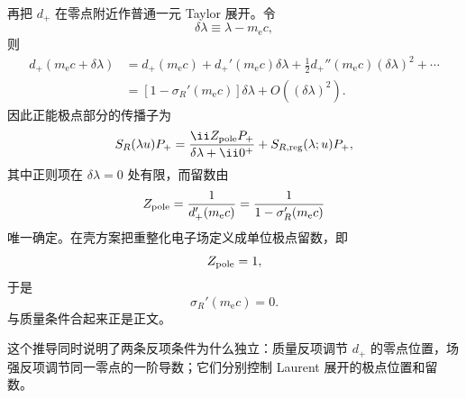 \begin{derivation}
再把 $d_+$ 在零点附近作普通一元 Taylor 展开。令
\begin{equation*}
 \delta\lambda\equiv\lambda-m_{\mathrm e} c,
\end{equation*}
则
\begin{align*}
 d_+(m_{\mathrm e} c+\delta\lambda)
 &=d_+(m_{\mathrm e} c)
 +d_+'(m_{\mathrm e} c)\delta\lambda
 +\frac12d_+''(m_{\mathrm e} c)(\delta\lambda)^2+\cdots\\
 &=\left[1-\sigma_R'(m_{\mathrm e} c)\right]\delta\lambda
 +O((\delta\lambda)^2).
\end{align*}
因此正能极点部分的传播子为
\begin{equation*}
 S_R(\lambda u)P_+
 =\frac{\ii Z_{\rm pole}P_+}{\delta\lambda+\ii0^+}
 +S_{R,\mathrm{reg}}(\lambda;u)P_+,
\end{equation*}
其中正则项在 $\delta\lambda=0$ 处有限，而留数由
\begin{equation*}
 Z_{\rm pole}
 =\frac{1}{d_+'(m_{\mathrm e} c)}
 =\frac{1}{1-\sigma_R'(m_{\mathrm e} c)}
\end{equation*}
唯一确定。在壳方案把重整化电子场定义成单位极点留数，即
\begin{equation*}
 Z_{\rm pole}=1,
\end{equation*}
于是
\begin{equation*}
 \sigma_R'(m_{\mathrm e} c)=0.
\end{equation*}
与质量条件合起来正是正文。

这个推导同时说明了两条反项条件为什么独立：质量反项调节 $d_+$ 的零点位置，场强反项调节同一零点的一阶导数；它们分别控制 Laurent 展开的极点位置和留数。
\end{derivation}

